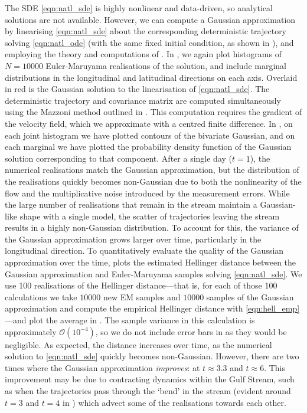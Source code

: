 The SDE \cref{eqn:natl_sde} is highly nonlinear and data-driven, so analytical solutions are not available.
However, we can compute a Gaussian approximation by linearising \cref{eqn:natl_sde} about the corresponding deterministic trajectory solving \cref{eqn:natl_ode} (with the same fixed initial condition, as shown in ), and employing the theory and computations of .
In , we again plot histograms of \(N = 10000\) Euler-Maruyama realisations of the solution, and include marginal distributions in the longitudinal and latitudinal directions on each axis.
Overlaid in red is the Gaussian solution to the linearisation of \cref{eqn:natl_sde}.
The deterministic trajectory and covariance matrix are computed simultaneously using the Mazzoni method outlined in .
This computation requires the gradient of the velocity field, which we approximate with a centred finite difference.
In , on each joint histogram we have plotted contours of the bivariate Gaussian, and on each marginal we have plotted the probability density function of the Gaussian solution corresponding to that component.
After a single day (\(t = 1\)), the numerical realisations match the Gaussian approximation, but the distribution of the realisations quickly becomes non-Gaussian due to both the nonlinearity of the flow and the multiplicative noise introduced by the measurement errors.
While the large number of realisations that remain in the stream maintain a Gaussian-like shape with a single model, the scatter of trajectories leaving the stream results in a highly non-Gaussian distribution.
To account for this, the variance of the Gaussian approximation grows larger over time, particularly in the longitudinal direction.
To quantitatively evaluate the quality of the Gaussian approximation over the time,  plots the estimated Hellinger distance between the Gaussian approximation and Euler-Maruyama samples solving \cref{eqn:natl_sde}.
We use 100 realisations of the Hellinger distance---that is, for each of those 100 calculations we take \(10000\) new EM samples and \(10000\) samples of the Gaussian approximation and compute the empirical Hellinger distance with \cref{eqn:hell_emp}---and plot the average in .
The sample variance in this calculation is approximately \(\mathcal{O}\!\left(10^{-4}\right)\), so we do not include error bars in  as they would be negligible.
As expected, the distance increases over time, as the numerical solution to \cref{eqn:natl_sde} quickly becomes non-Gaussian.
However, there are two times where the Gaussian approximation \emph{improves}: at \(t \approx 3.3\) and \(t \approx 6\).
This improvement may be due to contracting dynamics within the Gulf Stream, such as when the trajectories pass through the `bend' in the stream (evident around \(t = 3\) and \(t = 4\) in ) which advect some of the realisations towards each other.

